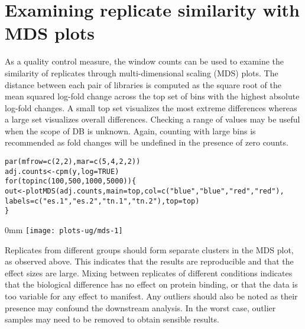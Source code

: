 \documentclass{report}\usepackage[]{graphicx}\usepackage[usenames,dvipsnames]{color}
\makeatletter
\def\maxwidth{ %
  \ifdim\Gin@nat@width>\linewidth
    \linewidth
  \else
    \Gin@nat@width
  \fi
}
\newcommand{\hlnum}[1]{\textcolor[rgb]{0.816,0.125,0.439}{#1}}%
\newcommand{\hlstr}[1]{\textcolor[rgb]{0.251,0.627,0.251}{#1}}%
\newcommand{\hlstd}[1]{\textcolor[rgb]{0.251,0.251,0.251}{#1}}%
\newcommand{\hlkwa}[1]{\textcolor[rgb]{0.125,0.125,0.941}{#1}}%
\newcommand{\hlkwb}[1]{\textcolor[rgb]{0,0,0}{#1}}%
\newcommand{\hlkwc}[1]{\textcolor[rgb]{0.251,0.251,0.251}{#1}}%
\newcommand{\hlkwd}[1]{\textcolor[rgb]{0.878,0.439,0.125}{#1}}%
\newenvironment{knitrout}{}{} %
\makeatother
\begin{document}
\section{Examining replicate similarity with MDS plots}
As a quality control measure, the window counts can be used to examine the similarity of replicates through multi-dimensional scaling (MDS) plots. 
The distance between each pair of libraries is computed as the square root of the mean squared log-fold change across the top set of bins with the highest absolute log-fold changes.
A small top set visualizes the most extreme differences whereas a large set visualizes overall differences.
Checking a range of  values may be useful when the scope of DB is unknown.
Again, counting with large bins is recommended as fold changes will be undefined in the presence of zero counts.

\begin{knitrout}
\color{fgcolor}\begin{kframe}
\begin{alltt}
\hlkwd{par}\hlstd{(}\hlkwc{mfrow}\hlstd{=}\hlkwd{c}\hlstd{(}\hlnum{2}\hlstd{,}\hlnum{2}\hlstd{),} \hlkwc{mar}\hlstd{=}\hlkwd{c}\hlstd{(}\hlnum{5}\hlstd{,}\hlnum{4}\hlstd{,}\hlnum{2}\hlstd{,}\hlnum{2}\hlstd{))}
\hlstd{adj.counts} \hlkwb{<-} \hlkwd{cpm}\hlstd{(y,} \hlkwc{log}\hlstd{=}\hlnum{TRUE}\hlstd{)}
\hlkwa{for} \hlstd{(top} \hlkwa{in} \hlkwd{c}\hlstd{(}\hlnum{100}\hlstd{,} \hlnum{500}\hlstd{,} \hlnum{1000}\hlstd{,} \hlnum{5000}\hlstd{)) \{}
    \hlstd{out} \hlkwb{<-} \hlkwd{plotMDS}\hlstd{(adj.counts,} \hlkwc{main}\hlstd{=top,} \hlkwc{col}\hlstd{=}\hlkwd{c}\hlstd{(}\hlstr{"blue"}\hlstd{,} \hlstr{"blue"}\hlstd{,} \hlstr{"red"}\hlstd{,} \hlstr{"red"}\hlstd{),}
                   \hlkwc{labels}\hlstd{=}\hlkwd{c}\hlstd{(}\hlstr{"es.1"}\hlstd{,} \hlstr{"es.2"}\hlstd{,} \hlstr{"tn.1"}\hlstd{,} \hlstr{"tn.2"}\hlstd{),} \hlkwc{top}\hlstd{=top)}
\hlstd{\}}
\end{alltt}
\end{kframe}\begin{adjustwidth}{\fltoffset}{0mm}
\texttt{[image: plots-ug/mds-1]} \end{adjustwidth}
\end{knitrout}

Replicates from different groups should form separate clusters in the MDS plot, as observed above.
This indicates that the results are reproducible and that the effect sizes are large.
Mixing between replicates of different conditions indicates that the biological difference has no effect on protein binding, or that the data is too variable for any effect to manifest.
Any outliers should also be noted as their presence may confound the downstream analysis.
In the worst case, outlier samples may need to be removed to obtain sensible results.
\end{document}
